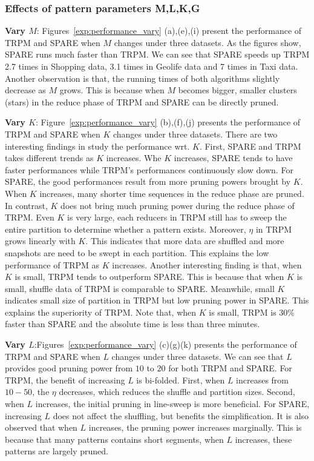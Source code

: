 \subsubsection{Effects of pattern parameters M,L,K,G}
\textbf{Vary $M$}: Figures~\ref{exp:performance_vary} (a),(e),(i)
present the performance of TRPM and SPARE when $M$ changes under three datasets.
As the figures show, SPARE runs much faster than TRPM. We can see that SPARE
speeds up TRPM 2.7 times in Shopping data, 3.1 times in Geolife data and
7 times in Taxi data. Another observation is that, the running times
of both algorithms slightly decrease as $M$ grows. This is
because when $M$ becomes bigger, smaller clusters (stars) in 
the reduce phase of TRPM and SPARE can be directly pruned.

\textbf{Vary $K$}: Figure~\ref{exp:performance_vary} (b),(f),(j) 
presents the performance of TRPM and SPARE when $K$ changes under three datasets. 
There are two interesting findings in study the performance wrt. $K$. 
First, SPARE and TRPM takes different trends as $K$ increases. 
Whe $K$ increases, SPARE tends to have faster performances 
while TRPM's performances continuously slow down. For SPARE, the 
good performances result from more pruning powers brought
by $K$. When $K$ increases, many shorter time sequences in the reduce phase
are pruned. In contrast, $K$ does not bring much pruning power
during the reduce phase of TRPM. Even $K$ is very large, each reducers in TRPM
still has to sweep the entire partition to determine whether a pattern exists.
Moreover, $\eta$ in TRPM grows linearly with $K$. This indicates that
more data are shuffled and more snapshots are need to
be swept in each partition. This explains the low performance of TRPM as $K$
increases. Another interesting finding is that, when $K$ is small,
TRPM tends to outperform SPARE. This is because that when $K$ is small, shuffle
data of TRPM is comparable to SPARE. Meanwhile, small $K$ indicates small
size of partition in TRPM but low pruning power in SPARE. This explains the
superiority of TRPM. Note that, when $K$ is small, TRPM is 30\% 
faster than SPARE and the absolute time is less than three minutes. 

\textbf{Vary $L$}:Figures~\ref{exp:performance_vary} (c)(g)(k) presents the performance
of TRPM and SPARE when $L$ changes under three datasets. We can see that $L$
provides good pruning power from $10$ to $20$ for both TRPM and SPARE. For TRPM,
the benefit of increasing $L$ is bi-folded. First, when $L$ increases from $10-50$, 
the $\eta$ decreases, which reduces the shuffle and partition sizes. Second, when
$L$ increases, the initial pruning in line-sweep is more beneficial. For SPARE,
increasing $L$ does not affect the shuffling, but benefits the simplification.
It is also observed that when $L$ increases, the pruning power increases marginally.
This is because that many patterns contains short segments, when $L$ increases,
these patterns are largely pruned.

